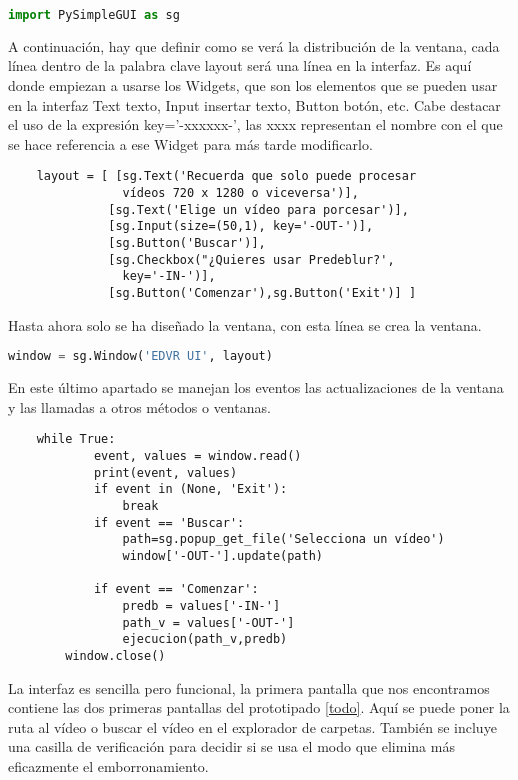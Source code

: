     \begin{lstlisting}[language=python]
    import PySimpleGUI as sg
    \end{lstlisting}
    
    A continuación, hay que definir como se verá la distribución de la ventana, cada línea dentro de la palabra clave layout será una línea en la interfaz. Es aquí donde empiezan a usarse los Widgets, que son los elementos que se pueden usar en la interfaz Text texto, Input insertar texto, Button botón, etc. Cabe destacar el uso de la expresión key='-xxxxxx-', las xxxx representan el nombre con el que se hace referencia a ese Widget para más tarde modificarlo.
    
    \begin{verbatim}
    layout = [ [sg.Text('Recuerda que solo puede procesar 
                vídeos 720 x 1280 o viceversa')],
              [sg.Text('Elige un vídeo para porcesar')],
              [sg.Input(size=(50,1), key='-OUT-')],
              [sg.Button('Buscar')],
              [sg.Checkbox("¿Quieres usar Predeblur?',
                key='-IN-')],
              [sg.Button('Comenzar'),sg.Button('Exit')] ]
    \end{verbatim}
    
    Hasta ahora solo se ha diseñado la ventana, con esta línea se crea la ventana.
    \begin{lstlisting}[language=python]
    window = sg.Window('EDVR UI', layout)
    \end{lstlisting}
    
    
    
    
    En este último apartado se manejan los eventos las actualizaciones de la ventana y las llamadas a otros métodos o ventanas.
    \begin{verbatim}
    while True: 
            event, values = window.read()
            print(event, values)
            if event in (None, 'Exit'):
                break
            if event == 'Buscar':
                path=sg.popup_get_file('Selecciona un vídeo')
                window['-OUT-'].update(path)
                
            if event == 'Comenzar':
                predb = values['-IN-']
                path_v = values['-OUT-']
                ejecucion(path_v,predb)
        window.close()
    \end{verbatim}
    
    
    La interfaz es sencilla pero funcional, la primera pantalla que nos encontramos contiene las dos primeras pantallas del prototipado \ref{todo}. Aquí se puede poner la ruta al vídeo o  buscar el vídeo en el explorador de carpetas. También se incluye una casilla de verificación para decidir si se usa el modo que elimina más eficazmente el emborronamiento.
    
